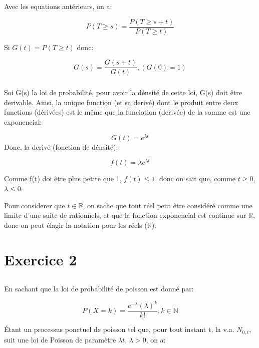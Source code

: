 \documentclass[a4paper]{article}
\begin{document}
Avec les equations antérieurs, on a: 

\begin{equation}
P(T\geq s )=\frac{P(T\geq s+t )}{P(T\geq t )}
\end{equation}

Si $G(t)=P(T\geq t )$ donc: 

\begin{equation}
G(s)=\frac{G(s+t)}{G(t)}, (G(0)= 1)
\end{equation}

\subsubsection{}
Soi G(s) la  loi de probabilité, pour  avoir la dénsité de cette  loi, G(s) doit
être derivable. Ainsi, la unique function (et sa derivé) dont le produit entre deux
functions (dérivées) est le même que la funciotion (derivée) de la somme est une
exponencial:

\begin{equation}
G(t)=e^{\lambda t}
\end{equation}
Donc, la derivé (fonction de dénsité):

\begin{equation}
f(t)=\lambda e^{\lambda t}
\end{equation}

Comme f(t)  doi être plus petite  que 1, $f(t)\leq  1$, donc on sait  que, comme
$t\geq 0$, $\lambda \leq 0$.

Pour  considerer que  $t  \in \mathbb{R}$,  on  sache que  tout  réel peut  être
considéré  comme  une limite  d'une  suite de  rationnels,  et  que la  fonction
exponencial est continue sur $\mathbb{R}$,  donc on peut élagir la notation pour
les réels ($\mathbb{R}$).

\section{Exercice 2 }


\subsection{}
En sachant que la loi de probabilité de poisson est donné par:

\begin{equation}
P(X=k )=\frac{e^{-\lambda }(\lambda )^k}{k!},k \in \mathbb{N}
\end{equation}

Étant un processus ponctuel de poisson tel que, pour tout instant t, la v.a. $N_{0,t}$,
suit une loi de Poisson de paramètre $\lambda t$, $\lambda >0$, on a:
\end{document}
